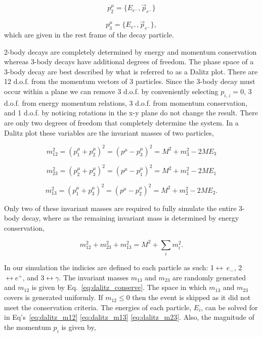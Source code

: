 \documentclass[12pt, letterpaper, twoside]{article}
\begin{document}
\begin{equation}
p^\mu_2 = \{E_{e^-},\vec{p}_{e^-}\}
\end{equation}

\begin{equation}
p^\mu_3 = \{E_{e^+},\vec{p}_{e^-}\},
\end{equation}
which are given in the rest frame of the decay particle.


2-body decays are completely determined by energy and momentum conservation whereas 3-body decays have additional degrees of freedom. The phase space of a 3-body decay are best described by what is referred to as a Dalitz plot. There are 12 d.o.f. from the momentum vectors of 3 particles. Since the 3-body decay must occur within a plane we can remove 3 d.o.f. by conveniently selecting $p_{i,z} = 0$, 3 d.o.f. from energy momentum relations, 3 d.o.f. from momentum conservation, and 1 d.o.f. by noticing rotations in the x-y plane do not change the result. There are only two degrees of freedom that completely determine the system. In a Dalitz plot these variables are the invariant masses of two particles,

\begin{equation}
m^2_{12} = (p^\mu_1 + p^\mu_2)^2 = (p^\mu - p^\mu_3)^2 = M^2 + m_3^2 - 2ME_3
\label{eq:dalitz_m12}
\end{equation}

\begin{equation}
m^2_{23} = (p^\mu_2 + p^\mu_3)^2 = (p^\mu - p^\mu_1)^2 = M^2 + m_1^2 - 2ME_1
\label{eq:dalitz_m23}
\end{equation}

\begin{equation}
m^2_{13} = (p^\mu_1 + p^\mu_3)^2 = (p^\mu - p^\mu_2)^2 = M^2 + m_2^2 - 2ME_2.
\label{eq:dalitz_m13}
\end{equation}

Only two of these invariant masses are required to fully simulate the entire 3-body decay, where as the remaining invariant mass is determined by energy conservation, 

\begin{equation}
m^2_{12} + m^2_{23} + m^2_{13} = M^2 + \sum_i m_i^2.
\label{eq:dalitz_conserve}
\end{equation}


In our simulation the indicies are defined to each particle as such: 1$\leftrightarrow~e_-$, 2$ \leftrightarrow e^+$, and 3$ \leftrightarrow \gamma$. The invariant masses $m_{13}$ and $m_{23}$ are randomly generated and $m_{12}$ is given by Eq.~\ref{eq:dalitz_conserve}. The space in which $m_{13}$ and $m_{23}$ covers is generated uniformly. If $m_{12} \leq 0$ then the event is skipped as it did not meet the conservation criteria. The energies of each particle, $E_i$, can be solved for in Eq's~\ref{eq:dalitz_m12} \ref{eq:dalitz_m13} \ref{eq:dalitz_m23}. Also, the magnitude of the momentum $p_i$ is given by,
\end{document}
